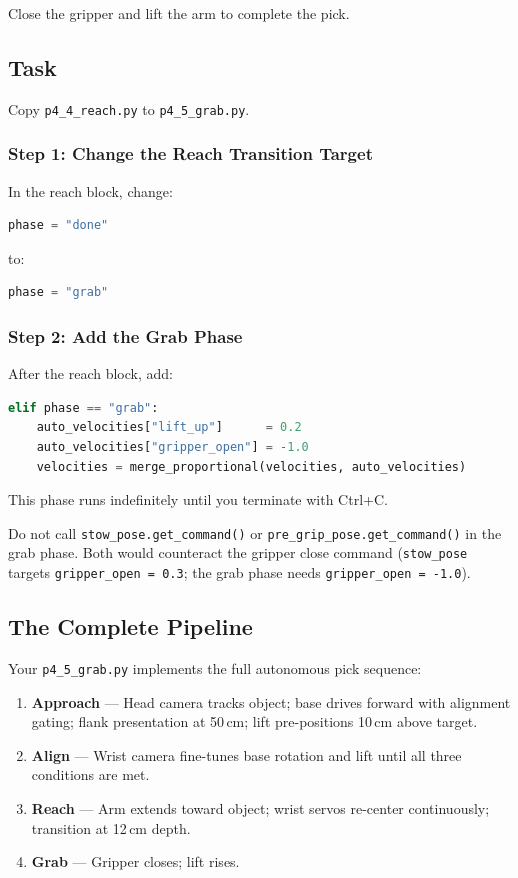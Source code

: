 \documentclass[11pt,a4paper]{article}
\begin{document}
Close the gripper and lift the arm to complete the pick.

\subsection*{Task}

Copy \texttt{p4\_4\_reach.py} to \texttt{p4\_5\_grab.py}.

\subsubsection*{Step 1: Change the Reach Transition Target}

In the reach block, change:
\begin{lstlisting}[language=Python]
phase = "done"
\end{lstlisting}
to:
\begin{lstlisting}[language=Python]
phase = "grab"
\end{lstlisting}

\subsubsection*{Step 2: Add the Grab Phase}

After the reach block, add:

\begin{lstlisting}[language=Python]
elif phase == "grab":
    auto_velocities["lift_up"]      = 0.2
    auto_velocities["gripper_open"] = -1.0
    velocities = merge_proportional(velocities, auto_velocities)
\end{lstlisting}

This phase runs indefinitely until you terminate with Ctrl+C.

\begin{notebox}
Do not call \texttt{stow\_pose.get\_command()} or \texttt{pre\_grip\_pose.get\_command()} in the grab phase. Both would counteract the gripper close command (\texttt{stow\_pose} targets \texttt{gripper\_open = 0.3}; the grab phase needs \texttt{gripper\_open = -1.0}).
\end{notebox}

\subsection*{The Complete Pipeline}

Your \texttt{p4\_5\_grab.py} implements the full autonomous pick sequence:

\begin{enumerate}
    \item \textbf{Approach} --- Head camera tracks object; base drives forward with alignment gating; flank presentation at 50\,cm; lift pre-positions 10\,cm above target.
    \item \textbf{Align} --- Wrist camera fine-tunes base rotation and lift until all three conditions are met.
    \item \textbf{Reach} --- Arm extends toward object; wrist servos re-center continuously; transition at 12\,cm depth.
    \item \textbf{Grab} --- Gripper closes; lift rises.
\end{enumerate}
\end{document}
